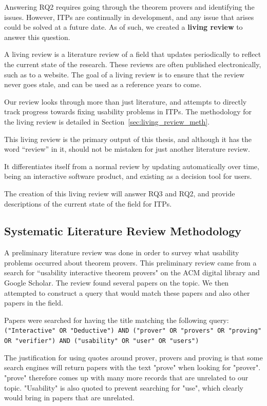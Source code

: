 \documentclass[
]{article}
\newcommand{\passthrough}[1]{#1}
\begin{document}
Answering RQ2 requires going through the theorem provers and identifying
the issues. However, ITPs are continually in development, and any issue
that arises could be solved at a future date. As of such, we created a
\textbf{living review} to answer this question.

A living review is a literature review of a field that updates
periodically to reflect the current state of the research. These reviews
are often published electronically, such as to a website. The goal of a
living review is to ensure that the review never goes stale, and can be
used as a reference years to come.

Our review looks through more than just literature, and attempts to
directly track progress towards fixing usability problems in ITPs. The
methodology for the living review is detailed in
Section~\ref{sec:living_review_meth}.

This living review is the primary output of this thesis, and although it
has the word ``review'' in it, should not be mistaken for just another
literature review.

It differentiates itself from a normal review by updating automatically
over time, being an interactive software product, and existing as a
decision tool for users.

The creation of this living review will answer RQ3 and RQ2, and provide
descriptions of the current state of the field for ITPs.

\hypertarget{sec:review_methodology}{%
\subsection{Systematic Literature Review
Methodology}\label{sec:review_methodology}}

A preliminary literature review was done in order to survey what
usability problems occurred about theorem provers. This preliminary
review came from a search for ``usability interactive theorem provers"
on the ACM digital library and Google Scholar. The review found several
papers on the topic. We then attempted to construct a query that would
match these papers and also other papers in the field.

Papers were searched for having the title matching the following query:
\passthrough{\lstinline!("Interactive" OR "Deductive") AND ("prover" OR "provers" OR "proving" OR "verifier") AND ("usability" OR "user" OR "users")!}

The justification for using quotes around prover, provers and proving is
that some search engines will return papers with the text "prove" when
looking for "prover". "prove" therefore comes up with many more records
that are unrelated to our topic. "Usability" is also quoted to prevent
searching for "use", which clearly would bring in papers that are
unrelated.
\end{document}
